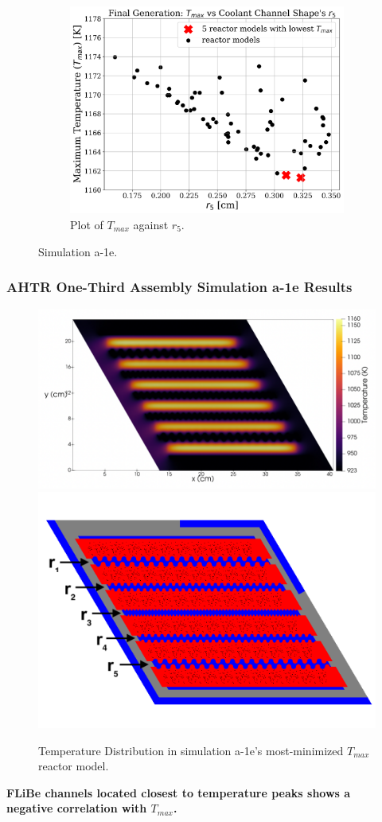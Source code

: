 \begin{frame}
\begin{figure}
        \begin{subfigure}{0.3\textwidth}
            \includegraphics[width=\linewidth]{../docs/figures/a-1e-r5.png}
            \caption{Plot of $T_{max}$ against $r_5$.}
            \label{fig:a-1e-r5} 
        \end{subfigure}
        \caption{Simulation a-1e.}
    \end{figure}
\end{frame}

\begin{frame}
    \frametitle{AHTR One-Third Assembly Simulation a-1e Results}
    \begin{figure}
        \includegraphics[width=0.55\linewidth]{../docs/figures/a-1e-temp-distribution-2d.png} 
        \includegraphics[width=0.4\linewidth]{../docs/figures/coolant-channel-shape-assem.png} 
        \caption{Temperature Distribution in simulation a-1e's most-minimized $T_{max}$ reactor 
        model.}
    \end{figure}
    \begin{tcolorbox}[colback=illiniorange,colframe=illiniorange!50!black]
    \textbf{FLiBe channels located closest to temperature peaks shows a \\ negative 
    correlation with $T_{max}$.}
    \end{tcolorbox}
\end{frame}

